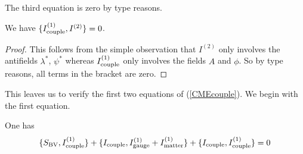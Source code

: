\documentclass[10pt, oneside]{article}
\begin{document}
The third equation is zero by type reasons.
\begin{lem} 
We have $\{I_{\rm couple}^{(1)}, I^{(2)}\} = 0$. 
\end{lem}
\begin{proof}
This follows from the simple observation that $I^{(2)}$ only involves the antifields $\lambda^*$, $\psi^*$ whereas $I^{(1)}_{\rm couple}$ only involves the fields $A$ and $\phi$.
So by type reasons, all terms in the bracket are zero.
\end{proof}

This leaves us to verify the first two equations of (\ref{CMEcouple}). 
We begin with the first equation. 

\begin{lem} One has
\[
\{S_{\rm BV} , I^{(1)}_{\rm couple}\} + \{I_{\rm couple}, I^{(1)}_{\rm gauge} + I^{(1)}_{\rm matter}\} + \{I_{\rm couple}, I^{(1)}_{\rm couple}\}  =  0 
\]
\end{lem}
\end{document}

